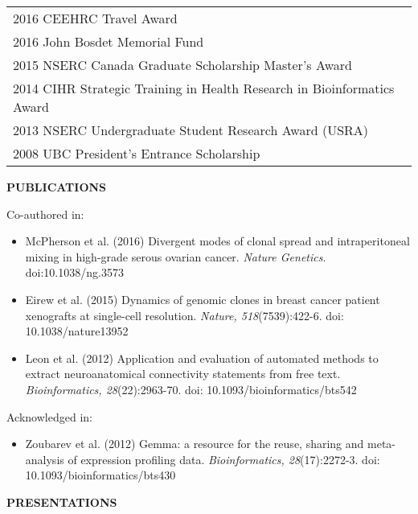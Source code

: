 \documentclass{res}
\renewcommand{\section}[1]{%
  \vspace{0.3in}%
  \centerline{\uppercase{\bf{#1}}}%
  \vspace{-6pt}}
\newcommand{\lineaward}[2]{%
  #1 \faTrophy{} #2\\[1ex]}
\newenvironment{publicationlists}{%
  \begin{itemize}\leftmargin=3em \itemindent=-1em \itemsep=2pt%
  }{%
  \end{itemize}}
\begin{document}
\begin{resume}
\begin{center}
  \begin{tabular}{l}
    \lineaward{2016}{CEEHRC Travel Award}
    \lineaward{2016}{John Bosdet Memorial Fund}
    \lineaward{2015}{NSERC Canada Graduate Scholarship Master's Award}
    \lineaward{2014}{CIHR Strategic Training in Health Research in Bioinformatics Award}
    \lineaward{2013}{NSERC Undergraduate Student Research Award (USRA)}
    \lineaward{2008}{UBC President's Entrance Scholarship}
  \end{tabular}
\end{center}
\vspace{-1em}

\section{Publications}

Co-authored in:\vspace{4pt}
\begin{publicationlists}
  \item McPherson et al. (2016) Divergent modes of clonal spread and intraperitoneal mixing in high-grade serous ovarian cancer. {\sl Nature Genetics}. doi:10.1038/ng.3573
  \item Eirew et al. (2015) Dynamics of genomic clones in breast cancer patient xenografts at single-cell resolution. {\sl Nature, 518}(7539):422-6. doi: 10.1038/nature13952
  \item Leon et al. (2012) Application and evaluation of automated methods to extract neuroanatomical connectivity statements from free text. {\sl Bioinformatics, 28}(22):2963-70. doi: 10.1093/bioinformatics/bts542
\end{publicationlists}

Acknowledged in:\vspace{4pt}
\begin{publicationlists}
  \item Zoubarev et al. (2012) Gemma: a resource for the reuse, sharing and meta-analysis of expression profiling data. {\sl Bioinformatics, 28}(17):2272-3. doi: 10.1093/bioinformatics/bts430
\end{publicationlists}

\section{Presentations}


\end{resume}
\end{document}

